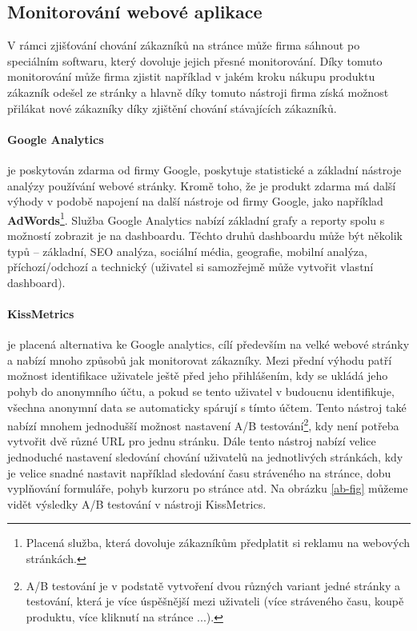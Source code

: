 \subsection{Monitorování webové aplikace}
\par V rámci zjišťování chování zákazníků na stránce může firma sáhnout po speciálním softwaru, který dovoluje jejich přesné monitorování. Díky tomuto monitorování může firma zjistit například v jakém kroku nákupu produktu zákazník odešel ze stránky a hlavně díky tomuto nástroji firma získá možnost přilákat nové zákazníky díky zjištění chování stávajících zákazníků. \cite{the-ux-book}

\paragraph{Google Analytics} je poskytován zdarma od firmy Google, poskytuje statistické a základní nástroje analýzy používání webové stránky. Kromě toho, že je produkt zdarma má další výhody v podobě napojení na další nástroje od firmy Google, jako například \textbf{AdWords}\footnote{Placená služba, která dovoluje zákazníkům předplatit si reklamu na webových stránkách.}. Služba Google Analytics nabízí základní grafy a reporty spolu s možností zobrazit je na dashboardu. Těchto druhů dashboardu může být několik typů -- základní, SEO analýza, sociální média, geografie, mobilní analýza, příchozí/odchozí a technický (uživatel si samozřejmě může vytvořit vlastní dashboard).

\paragraph{KissMetrics} je placená alternativa ke Google analytics, cílí především na velké webové stránky a nabízí mnoho způsobů jak monitorovat zákazníky. Mezi přední výhodu patří možnost identifikace uživatele ještě před jeho přihlášením, kdy se ukládá jeho pohyb do anonymního účtu, a pokud se tento uživatel v budoucnu identifikuje, všechna anonymní data se automaticky spárují s tímto účtem. Tento nástroj také nabízí mnohem jednodušší možnost nastavení A/B testování\footnote{A/B testování je v podstatě vytvoření dvou různých variant jedné stránky a testování, která je více úspěšnější mezi uživateli (více stráveného času, koupě produktu, více kliknutí na stránce ...).}, kdy není potřeba vytvořit dvě různé URL pro jednu stránku. Dále tento nástroj nabízí velice jednoduché nastavení sledování chování uživatelů na jednotlivých stránkách, kdy je velice snadné nastavit například sledování času stráveného na stránce, dobu vyplňování formuláře, pohyb kurzoru po stránce atd. Na obrázku \ref{ab-fig} můžeme vidět výsledky A/B testování v nástroji KissMetrics.

